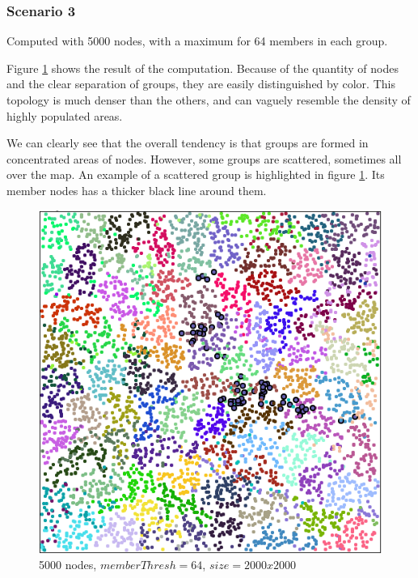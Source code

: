 \documentclass[a4paper,UKenglish]{report}
\begin{document}
\subsubsection{Scenario 3}
Computed with 5000 nodes, with a maximum for 64 members in each group. 

Figure \ref{fig:2000_64} shows the result of the computation. Because of the quantity
of nodes and the clear separation of groups, they are easily distinguished by color.
This topology is much denser than the others, and can vaguely resemble the density of highly populated areas.

We can clearly see that the overall tendency is that groups are formed
in concentrated areas of nodes. However, some groups are scattered, sometimes
all over the map. An example of a scattered group is highlighted
in figure \ref{fig:2000_64}. Its  member nodes has a thicker black line around them. 
\begin{figure}
	\center
	\includegraphics[scale=0.45]{Images/scenario3alt.png}
	\caption{5000 nodes, $memberThresh=64$, $size=2000x2000$}
	\label{fig:2000_64}
\end{figure}






%
\end{document}
